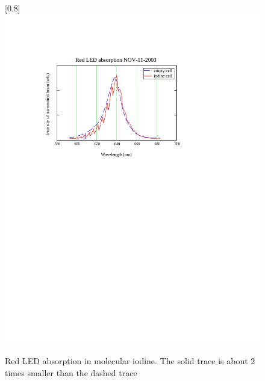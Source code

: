\begin{figure}
\scalebox{0.8}[0.8]{
\includegraphics[bb=0 450 489 700]
{redLED/redLED.pdf}
}
\caption[Red LED absorption in molecular iodine]{Red LED absorption in molecular iodine. The solid trace is about 2 times smaller than the dashed trace}
\label{redLED}
\end{figure}
